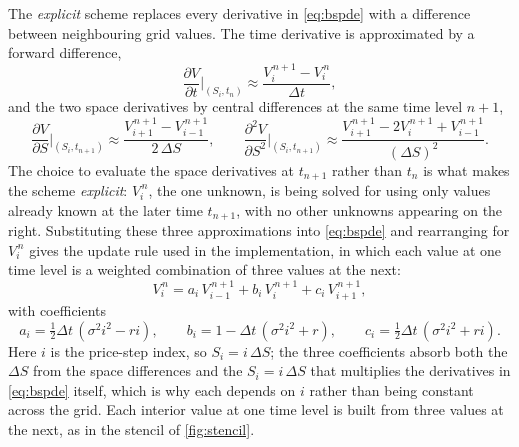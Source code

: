 \documentclass[11pt,a4paper]{article}
\numberwithin{equation}{section}
\theoremstyle{definition}
\theoremstyle{plain}
\theoremstyle{remark}
\begin{document}
The \emph{explicit} scheme replaces every derivative in \eqref{eq:bspde} with a
difference between neighbouring grid values. The time derivative is
approximated by a forward difference,
\[
  \frac{\partial V}{\partial t}\bigg|_{(S_i,t_n)}
  \approx \frac{V_i^{\,n+1} - V_i^{\,n}}{\Delta t},
\]
and the two space derivatives by central differences at the same time level
$n+1$,
\[
  \frac{\partial V}{\partial S}\bigg|_{(S_i,t_{n+1})}
  \approx \frac{V_{i+1}^{\,n+1} - V_{i-1}^{\,n+1}}{2\,\Delta S}, \qquad
  \frac{\partial^2 V}{\partial S^2}\bigg|_{(S_i,t_{n+1})}
  \approx \frac{V_{i+1}^{\,n+1} - 2V_i^{\,n+1} + V_{i-1}^{\,n+1}}{(\Delta S)^2}.
\]
The choice to evaluate the space derivatives at $t_{n+1}$ rather than $t_n$ is
what makes the scheme \emph{explicit}: $V_i^{\,n}$, the one unknown, is being
solved for using only values already known at the later time $t_{n+1}$, with
no other unknowns appearing on the right. Substituting these three
approximations into \eqref{eq:bspde} and rearranging
for $V_i^{\,n}$ gives the update rule used in the implementation, in which each
value at one time level is a weighted combination of three values at the next:
\begin{equation}\label{eq:fd-update}
  V_i^{\,n} = a_i\,V_{i-1}^{\,n+1} + b_i\,V_i^{\,n+1} + c_i\,V_{i+1}^{\,n+1},
\end{equation}
with coefficients
\begin{equation}\label{eq:fd-coeffs}
  a_i = \tfrac{1}{2}\Delta t\,(\sigma^2 i^2 - r i), \qquad
  b_i = 1 - \Delta t\,(\sigma^2 i^2 + r), \qquad
  c_i = \tfrac{1}{2}\Delta t\,(\sigma^2 i^2 + r i).
\end{equation}
Here $i$ is the price-step index, so $S_i = i\,\Delta S$; the three
coefficients absorb both the $\Delta S$ from the space differences and the
$S_i = i\,\Delta S$ that multiplies the derivatives in \eqref{eq:bspde}
itself, which is why each depends on $i$ rather than being constant across
the grid. Each interior value at one time level is built from three values at
the next, as in the stencil of \cref{fig:stencil}.
\end{document}
